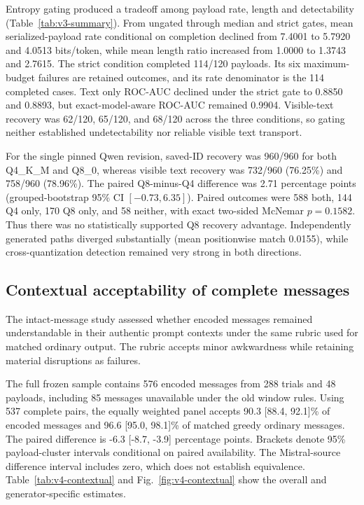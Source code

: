 \documentclass[fleqn,10pt]{wlscirep}
\begin{document}
Entropy gating produced a tradeoff among payload rate, length and detectability (Table~\ref{tab:v3-summary}). From ungated through median and strict gates, mean serialized-payload rate conditional on completion declined from 7.4001 to 5.7920 and 4.0513 bits/token, while mean length ratio increased from 1.0000 to 1.3743 and 2.7615. The strict condition completed 114/120 payloads. Its six maximum-budget failures are retained outcomes, and its rate denominator is the 114 completed cases. Text only ROC-AUC declined under the strict gate to 0.8850 and 0.8893, but exact-model-aware ROC-AUC remained 0.9904. Visible-text recovery was 62/120, 65/120, and 68/120 across the three conditions, so gating neither established undetectability nor reliable visible text transport.

For the single pinned Qwen revision, saved-ID recovery was 960/960 for both Q4\_K\_M and Q8\_0, whereas visible text recovery was 732/960 (76.25\%) and 758/960 (78.96\%). The paired Q8-minus-Q4 difference was 2.71 percentage points (grouped-bootstrap 95\% CI \([-0.73,6.35]\)). Paired outcomes were 588 both, 144 Q4 only, 170 Q8 only, and 58 neither, with exact two-sided McNemar \(p=0.1582\). Thus there was no statistically supported Q8 recovery advantage. Independently generated paths diverged substantially (mean positionwise match 0.0155), while cross-quantization detection remained very strong in both directions.



\subsection*{Contextual acceptability of complete messages}\label{sec:v4-contextual-results}\label{sec:v4-results}
The intact-message study assessed whether encoded messages remained understandable in their authentic prompt contexts under the same rubric used for matched ordinary output. The rubric accepts minor awkwardness while retaining material disruptions as failures.

The full frozen sample contains 576 encoded messages from 288 trials and 48 payloads, including 85 messages unavailable under the old window rules. Using 537 complete pairs, the equally weighted panel accepts 90.3 [88.4, 92.1]\% of encoded messages and 96.6 [95.0, 98.1]\% of matched greedy ordinary messages. The paired difference is -6.3 [-8.7, -3.9] percentage points. Brackets denote 95\% payload-cluster intervals conditional on paired availability. The Mistral-source difference interval includes zero, which does not establish equivalence. Table~\ref{tab:v4-contextual} and Fig.~\ref{fig:v4-contextual} show the overall and generator-specific estimates.
\end{document}
